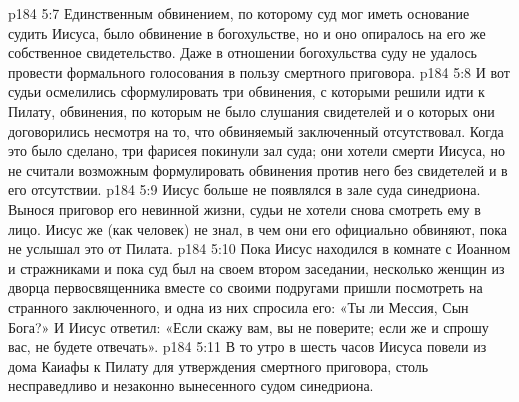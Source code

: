 \vs p184 5:7 Единственным обвинением, по которому суд мог иметь основание судить Иисуса, было обвинение в богохульстве, но и оно опиралось на его же собственное свидетельство. Даже в отношении богохульства суду не удалось провести формального голосования в пользу смертного приговора.
\vs p184 5:8 И вот судьи осмелились сформулировать три обвинения, с которыми решили идти к Пилату, обвинения, по которым не было слушания свидетелей и о которых они договорились несмотря на то, что обвиняемый заключенный отсутствовал. Когда это было сделано, три фарисея покинули зал суда; они хотели смерти Иисуса, но не считали возможным формулировать обвинения против него без свидетелей и в его отсутствии.
\vs p184 5:9 Иисус больше не появлялся в зале суда синедриона. Вынося приговор его невинной жизни, судьи не хотели снова смотреть ему в лицо. Иисус же (как человек) не знал, в чем они его официально обвиняют, пока не услышал это от Пилата.
\vs p184 5:10 \pc Пока Иисус находился в комнате с Иоанном и стражниками и пока суд был на своем втором заседании, несколько женщин из дворца первосвященника вместе со своими подругами пришли посмотреть на странного заключенного, и одна из них спросила его: «Ты ли Мессия, Сын Бога?» И Иисус ответил: «Если скажу вам, вы не поверите; если же и спрошу вас, не будете отвечать».
\vs p184 5:11 В то утро в шесть часов Иисуса повели из дома Каиафы к Пилату для утверждения смертного приговора, столь несправедливо и незаконно вынесенного судом синедриона.

